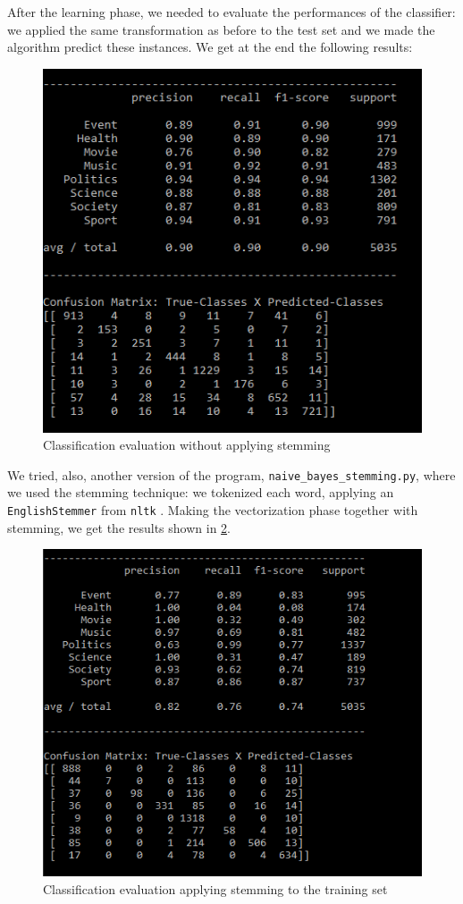 \documentclass[journal,11pt]{vgtc}
\begin{document}
After the learning phase, we needed to evaluate the performances of the classifier: we applied the same transformation as before
to the test set and we made the algorithm predict these instances. We get at the end the following results:

\begin{figure}[h]
 \centering
 \includegraphics[scale=0.5]{naive_bayes_no_stemming}
 \caption{Classification evaluation without applying stemming}
 \label{no-stemming}
\end{figure}

We tried, also, another version of the program, \texttt{naive\_bayes\_stemming.py}, where we used the stemming technique:
we tokenized each word, applying an \texttt{EnglishStemmer} from \texttt{nltk} \cite{nltk}.
Making the vectorization phase together with stemming, we get the results shown in \ref{stemming}.

\begin{figure}[h]
 \centering
 \includegraphics[scale=0.5]{naive_bayes_stemming}
 \caption{Classification evaluation applying stemming to the training set}
 \label{stemming}
\end{figure}
\end{document}
